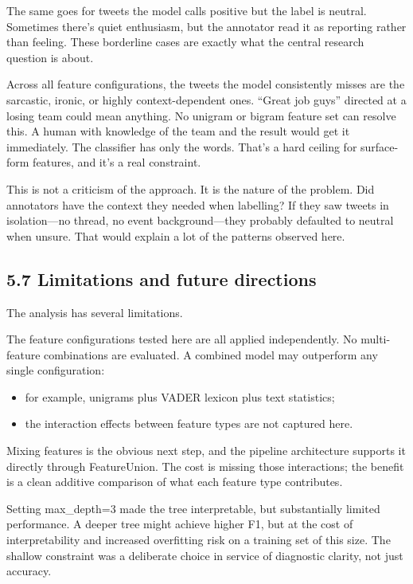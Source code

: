 \documentclass[12pt]{article}
\begin{document}
The same goes for tweets the model calls positive but the label is neutral. Sometimes there's quiet enthusiasm, but the annotator read it as reporting rather than feeling. These borderline cases are exactly what the central research question is about.

Across all feature configurations, the tweets the model consistently misses are the sarcastic, ironic, or highly context-dependent ones. ``Great job guys'' directed at a losing team could mean anything. No unigram or bigram feature set can resolve this. A human with knowledge of the team and the result would get it immediately. The classifier has only the words. That's a hard ceiling for surface-form features, and it's a real constraint.

This is not a criticism of the approach. It is the nature of the problem. Did annotators have the context they needed when labelling? If they saw tweets in isolation---no thread, no event background---they probably defaulted to neutral when unsure. That would explain a lot of the patterns observed here.



\subsection*{5.7 Limitations and future directions}



The analysis has several limitations.

The feature configurations tested here are all applied independently. No multi-feature combinations are evaluated. A combined model may outperform any single configuration:

\begin{itemize}

  \item for example, unigrams plus VADER lexicon plus text statistics;

  \item the interaction effects between feature types are not captured here.

\end{itemize} Mixing features is the obvious next step, and the pipeline architecture supports it directly through FeatureUnion. The cost is missing those interactions; the benefit is a clean additive comparison of what each feature type contributes.

Setting max\_depth=3 made the tree interpretable, but substantially limited performance. A deeper tree might achieve higher F1, but at the cost of interpretability and increased overfitting risk on a training set of this size. The shallow constraint was a deliberate choice in service of diagnostic clarity, not just accuracy.
\end{document}
